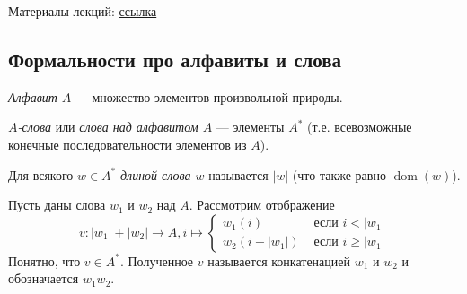 \documentclass[12pt,a4paper]{article}
\date{}
\DeclareMathOperator{\dom}{dom}
\begin{document}
    \maketitle

    \listoftodos[TODOs]

    \tableofcontents

    \vspace{2em}
    Материалы лекций: \href{http://www.mi-ras.ru/~speranski/courses/logic-1-2021-spring/materials.html}{ссылка}
    

    \subsection{Формальности про алфавиты и слова}

    \begin{definition}
        \emph{Алфавит} $A$ --- множество элементов произвольной природы.

        \emph{$A$-слова} или \emph{слова над алфавитом $A$} --- элементы $A^*$ (т.е. всевозможные конечные последовательности элементов из $A$).

        Для всякого $w \in A^*$ \emph{длиной слова $w$} называется $|w|$ (что также равно $\dom(w)$).
    \end{definition}

    \begin{definition}
        Пусть даны слова $w_1$ и $w_2$ над $A$. Рассмотрим отображение
        \[
            v:
            |w_1| + |w_2| \to A,
            i \mapsto \begin{cases}
                w_1(i)& \text{ если $i < |w_1|$}\\
                w_2(i - |w_1|)& \text{ если $i \geqslant |w_1|$}
            \end{cases}
        \]
        Понятно, что $v \in A^*$. Полученное $v$ называется конкатенацией $w_1$ и $w_2$ и обозначается $w_1w_2$.
    \end{definition}
\end{document}
